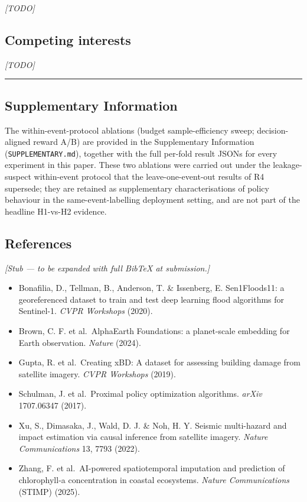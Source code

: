 \emph{{[}TODO{]}}

\subsection{Competing interests}\label{competing-interests}

\emph{{[}TODO{]}}

\begin{center}\rule{0.5\linewidth}{0.5pt}\end{center}

\subsection{Supplementary Information}\label{supplementary-information}

The within-event-protocol ablations (budget sample-efficiency sweep;
decision-aligned reward A/B) are provided in the Supplementary
Information (\texttt{SUPPLEMENTARY.md}), together with the full per-fold
result JSONs for every experiment in this paper. These two ablations
were carried out under the leakage-suspect within-event protocol that
the leave-one-event-out results of R4 supersede; they are retained as
supplementary characterisations of policy behaviour in the
same-event-labelling deployment setting, and are not part of the
headline H1-vs-H2 evidence.

\subsection{References}\label{references}

\emph{{[}Stub --- to be expanded with full BibTeX at submission.{]}}

\begin{itemize}
\tightlist
\item
  Bonafilia, D., Tellman, B., Anderson, T. \& Issenberg, E. Sen1Floods11: a
  georeferenced dataset to train and test deep learning flood algorithms for
  Sentinel-1. \emph{CVPR Workshops} (2020).
\item
  Brown, C. F. et al.~AlphaEarth Foundations: a planet-scale embedding for
  Earth observation. \emph{Nature} (2024).
\item
  Gupta, R. et al.~Creating xBD: A dataset for assessing building damage from
  satellite imagery. \emph{CVPR Workshops} (2019).
\item
  Schulman, J. et al.~Proximal policy optimization algorithms. \emph{arXiv}
  1707.06347 (2017).
\item
  Xu, S., Dimasaka, J., Wald, D. J. \& Noh, H. Y. Seismic multi-hazard and
  impact estimation via causal inference from satellite imagery. \emph{Nature
  Communications} 13, 7793 (2022).
\item
  Zhang, F. et al.~AI-powered spatiotemporal imputation and prediction of
  chlorophyll-a concentration in coastal ecosystems. \emph{Nature Communications}
  (STIMP) (2025).
\end{itemize}
